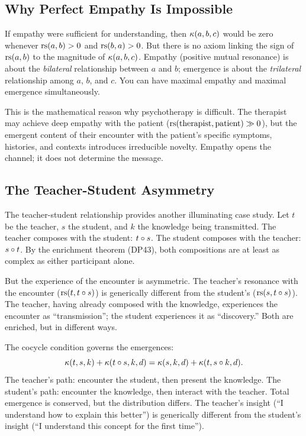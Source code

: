 \subsection{Why Perfect Empathy Is Impossible}

If empathy were sufficient for understanding, then $\kappa(a, b, c)$ would
be zero whenever $\mathrm{rs}(a, b) > 0$ and $\mathrm{rs}(b, a) > 0$.  But there is no
axiom linking the sign of $\mathrm{rs}(a, b)$ to the magnitude of $\kappa(a, b, c)$.
Empathy (positive mutual resonance) is about the \emph{bilateral} relationship
between $a$ and $b$; emergence is about the \emph{trilateral} relationship
among $a$, $b$, and $c$.  You can have maximal empathy and maximal emergence
simultaneously.

This is the mathematical reason why psychotherapy is difficult.  The therapist
may achieve deep empathy with the patient ($\mathrm{rs}(\text{therapist}, \text{patient})
\gg 0$), but the emergent content of their encounter with the patient's specific
symptoms, histories, and contexts introduces irreducible novelty.  Empathy
opens the channel; it does not determine the message.

\subsection{The Teacher-Student Asymmetry}

The teacher-student relationship provides another illuminating case study.  Let
$t$ be the teacher, $s$ the student, and $k$ the knowledge being transmitted.
The teacher composes with the student: $t \circ s$.  The student composes
with the teacher: $s \circ t$.  By the enrichment theorem (DP43), both
compositions are at least as complex as either participant alone.

But the experience of the encounter is asymmetric.  The teacher's resonance
with the encounter ($\mathrm{rs}(t, t \circ s)$) is generically different from the
student's ($\mathrm{rs}(s, t \circ s)$).  The teacher, having already composed with
the knowledge, experiences the encounter as ``transmission''; the student
experiences it as ``discovery.''  Both are enriched, but in different ways.

The cocycle condition governs the emergences:
\[
\kappa(t, s, k) + \kappa(t \circ s, k, d)
= \kappa(s, k, d) + \kappa(t, s \circ k, d).
\]
The teacher's path: encounter the student, then present the knowledge.  The
student's path: encounter the knowledge, then interact with the teacher.  Total
emergence is conserved, but the distribution differs.  The teacher's insight
(``I understand how to explain this better'') is generically different from the
student's insight (``I understand this concept for the first time'').

